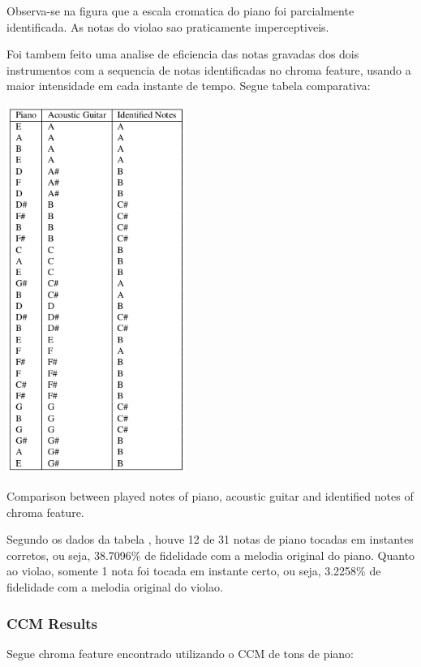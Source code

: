 \documentclass{article}
\begin{document}
	Observa-se na figura  que a escala cromatica do piano foi parcialmente identificada. As notas do violao sao praticamente imperceptiveis.

	Foi tambem feito uma analise de eficiencia das notas gravadas dos dois instrumentos com a sequencia de notas identificadas no chroma feature, usando a maior intensidade em cada instante de tempo. Segue tabela comparativa:

	\begin{table}[h]
	 \begin{center}
	 	\centerline{
	 \includegraphics[width=\columnwidth,height=12cm]{figs/tabela_2.png}}
	 \end{center}
	 \caption{Comparison between played notes of piano, acoustic guitar and identified notes of chroma feature.}
	 \label{tab:table-2-sfft}
	\end{table}

	Segundo os dados da tabela , houve 12 de 31 notas de piano tocadas em instantes corretos, ou seja, 38.7096\% de fidelidade com a melodia original do piano. Quanto ao violao, somente 1 nota foi tocada em instante certo, ou seja, 3.2258\% de fidelidade com a melodia original do violao.

	\subsubsection{CCM Results}
	Segue chroma feature encontrado utilizando o CCM de tons de piano:
	
\end{document}

